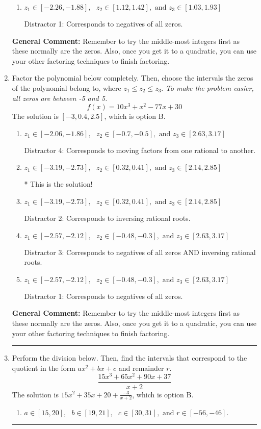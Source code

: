 \documentclass{extbook}[14pt]
\newcommand{\litem}[1]{\item #1

\rule{\textwidth}{0.4pt}}
\begin{document}
\begin{enumerate}
{\begin{enumerate}[label=\Alph*.]
 Distractor 3: Corresponds to negatives of all zeros AND inversing rational roots.
\item \( z_1 \in [-2.26, -1.88], \text{   }  z_2 \in [1.12, 1.42], \text{   and   } z_3 \in [1.03, 1.93] \)

 Distractor 1: Corresponds to negatives of all zeros.
\end{enumerate}

\textbf{General Comment:} Remember to try the middle-most integers first as these normally are the zeros. Also, once you get it to a quadratic, you can use your other factoring techniques to finish factoring.
}
\litem{
Factor the polynomial below completely. Then, choose the intervals the zeros of the polynomial belong to, where $z_1 \leq z_2 \leq z_3$. \textit{To make the problem easier, all zeros are between -5 and 5.}
\[ f(x) = 10x^{3} + x^{2} -77 x + 30 \]The solution is \( [-3, 0.4, 2.5] \), which is option B.\begin{enumerate}[label=\Alph*.]
\item \( z_1 \in [-2.06, -1.86], \text{   }  z_2 \in [-0.7, -0.5], \text{   and   } z_3 \in [2.63, 3.17] \)

 Distractor 4: Corresponds to moving factors from one rational to another.
\item \( z_1 \in [-3.19, -2.73], \text{   }  z_2 \in [0.32, 0.41], \text{   and   } z_3 \in [2.14, 2.85] \)

* This is the solution!
\item \( z_1 \in [-3.19, -2.73], \text{   }  z_2 \in [0.32, 0.41], \text{   and   } z_3 \in [2.14, 2.85] \)

 Distractor 2: Corresponds to inversing rational roots.
\item \( z_1 \in [-2.57, -2.12], \text{   }  z_2 \in [-0.48, -0.3], \text{   and   } z_3 \in [2.63, 3.17] \)

 Distractor 3: Corresponds to negatives of all zeros AND inversing rational roots.
\item \( z_1 \in [-2.57, -2.12], \text{   }  z_2 \in [-0.48, -0.3], \text{   and   } z_3 \in [2.63, 3.17] \)

 Distractor 1: Corresponds to negatives of all zeros.
\end{enumerate}

\textbf{General Comment:} Remember to try the middle-most integers first as these normally are the zeros. Also, once you get it to a quadratic, you can use your other factoring techniques to finish factoring.
}
\litem{
Perform the division below. Then, find the intervals that correspond to the quotient in the form $ax^2+bx+c$ and remainder $r$.
\[ \frac{15x^{3} +65 x^{2} +90 x + 37}{x + 2} \]The solution is \( 15x^{2} +35 x + 20 + \frac{-3}{x + 2} \), which is option B.\begin{enumerate}[label=\Alph*.]
\item \( a \in [15, 20], \text{   } b \in [19, 21], \text{   } c \in [30, 31], \text{   and   } r \in [-56, -46]. \)


\end{enumerate}}
\end{enumerate}
\end{document}
